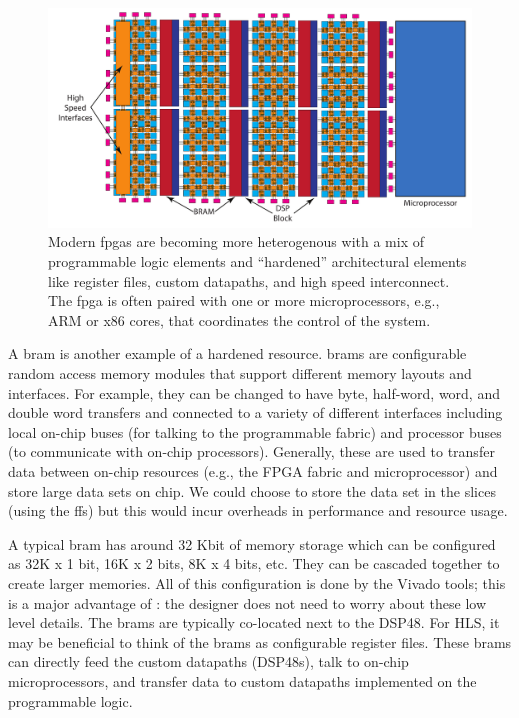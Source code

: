 \begin{figure}
\centering
\includegraphics[width=\textwidth]{images/heterogenous_fpga}
\caption{ Modern \glspl{fpga} are becoming more heterogenous with a mix of programmable logic elements and ``hardened'' architectural elements like register files, custom datapaths, and high speed interconnect. The \gls{fpga} is often paired with one or more microprocessors, e.g., ARM or x86 cores, that coordinates the control of the system. }
\label{fig:heterogenous_fpga}
\end{figure}

A \gls{bram} is another example of a hardened resource. \glspl{bram} are configurable random access memory modules that support different memory layouts and interfaces. For example, they can be changed to have byte, half-word, word, and double word transfers and connected to a variety of different interfaces including local on-chip buses (for talking to the programmable fabric) and processor buses (to communicate with on-chip processors). Generally, these are used to transfer data between on-chip resources (e.g., the FPGA fabric and microprocessor) and store large data sets on chip. We could choose to store the data set in the slices (using the \glspl{ff}) but this would incur overheads in performance and resource usage. 

A typical \gls{bram} has around 32 Kbit of memory storage which can be configured as 32K x 1 bit, 16K x 2 bits, 8K x 4 bits, etc. They can be cascaded together to create larger memories. All of this configuration is done by the Vivado tools; this is a major advantage of \VHLS: the designer does not need to worry about these low level details. The \glspl{bram} are typically co-located next to the DSP48. For HLS, it may be beneficial to think of the \glspl{bram} as configurable register files. These \glspl{bram} can directly feed the custom datapaths (DSP48s), talk to on-chip microprocessors, and transfer data to custom datapaths implemented on the programmable logic.

